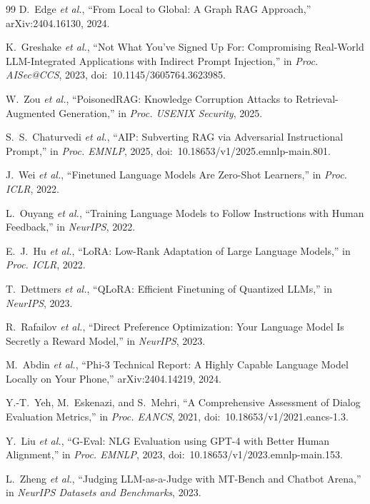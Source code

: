 \documentclass[conference]{IEEEtran}
\begin{document}
\begin{thebibliography}{99}
D.~Edge \emph{et al.}, ``From Local to Global: A Graph RAG Approach,''
arXiv:2404.16130, 2024.

K.~Greshake \emph{et al.}, ``Not What You've Signed Up For: Compromising
Real-World LLM-Integrated Applications with Indirect Prompt Injection,''
in \emph{Proc. AISec@CCS}, 2023, doi:~10.1145/3605764.3623985.

W.~Zou \emph{et al.}, ``PoisonedRAG: Knowledge Corruption Attacks to
Retrieval-Augmented Generation,'' in \emph{Proc. USENIX Security}, 2025.

S.~S.~Chaturvedi \emph{et al.}, ``AIP: Subverting RAG via Adversarial
Instructional Prompt,'' in \emph{Proc. EMNLP}, 2025,
doi:~10.18653/v1/2025.emnlp-main.801.

J.~Wei \emph{et al.}, ``Finetuned Language Models Are Zero-Shot
Learners,'' in \emph{Proc. ICLR}, 2022.

L.~Ouyang \emph{et al.}, ``Training Language Models to Follow Instructions
with Human Feedback,'' in \emph{NeurIPS}, 2022.

E.~J.~Hu \emph{et al.}, ``LoRA: Low-Rank Adaptation of Large Language
Models,'' in \emph{Proc. ICLR}, 2022.

T.~Dettmers \emph{et al.}, ``QLoRA: Efficient Finetuning of Quantized
LLMs,'' in \emph{NeurIPS}, 2023.

R.~Rafailov \emph{et al.}, ``Direct Preference Optimization: Your Language
Model Is Secretly a Reward Model,'' in \emph{NeurIPS}, 2023.

M.~Abdin \emph{et al.}, ``Phi-3 Technical Report: A Highly Capable
Language Model Locally on Your Phone,'' arXiv:2404.14219, 2024.

Y.-T.~Yeh, M.~Eskenazi, and S.~Mehri, ``A Comprehensive Assessment of
Dialog Evaluation Metrics,'' in \emph{Proc. EANCS}, 2021,
doi:~10.18653/v1/2021.eancs-1.3.

Y.~Liu \emph{et al.}, ``G-Eval: NLG Evaluation using GPT-4 with Better
Human Alignment,'' in \emph{Proc. EMNLP}, 2023,
doi:~10.18653/v1/2023.emnlp-main.153.

L.~Zheng \emph{et al.}, ``Judging LLM-as-a-Judge with MT-Bench and
Chatbot Arena,'' in \emph{NeurIPS Datasets and Benchmarks}, 2023.


\end{thebibliography}
\end{document}
